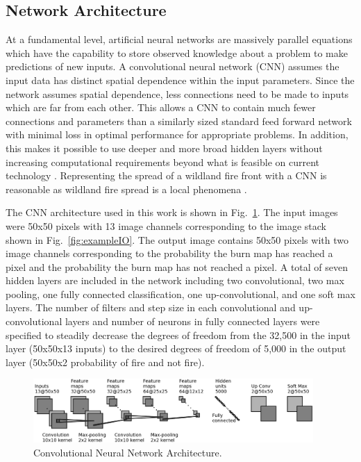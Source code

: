 \documentclass[smallcondensed]{svjour3}     %
\begin{document}
\subsection{Network Architecture}
\label{ss:Na}


At a fundamental level, artificial neural networks are massively parallel
equations which have the capability to store observed knowledge about a
problem to make predictions of new inputs. A convolutional neural network
(CNN) assumes the input data has distinct
spatial dependence within the input parameters. Since the network
assumes spatial dependence, less connections need to be made to
inputs which are far from each other. This allows a CNN to contain much
fewer connections and parameters than a similarly sized standard feed
forward network with minimal loss in optimal performance for appropriate
problems. In addition, this makes it possible to use deeper and more broad hidden
layers without increasing computational requirements beyond what is
feasible on current technology \cite{krizhevsky2012imagenet}.
Representing the spread of a wildland fire front with a CNN is
reasonable as wildland fire spread is a local phenomena \cite{finney1999mechanistic}.

The CNN architecture used in this work is shown in Fig.~\ref{fig:cnnArchitecture}.
The input images were 50x50 pixels with 13 image channels corresponding to the
image stack shown in Fig.~\ref{fig:exampleIO}. The output image contains 50x50 pixels
with two image channels corresponding to the probability the burn map has reached
a pixel and the probability the burn map has not reached a pixel.
A total of seven hidden layers
are included in the network including two convolutional, two max pooling, one fully connected
classification, one up-convolutional, and one soft max layers. The number of filters
and step size in each convolutional and up-convolutional layers and number of neurons
in fully connected layers were specified to steadily decrease the degrees of freedom from the
32,500 in the input layer (50x50x13 inputs) to the desired degrees of freedom of
5,000 in the output layer (50x50x2 probability of fire and not fire).

\begin{figure}[htb!]
\centering
  \includegraphics[width=0.95\textwidth]{convnet_fig.png}
\caption{Convolutional Neural Network Architecture.}
\label{fig:cnnArchitecture}       %
\end{figure}
\end{document}
